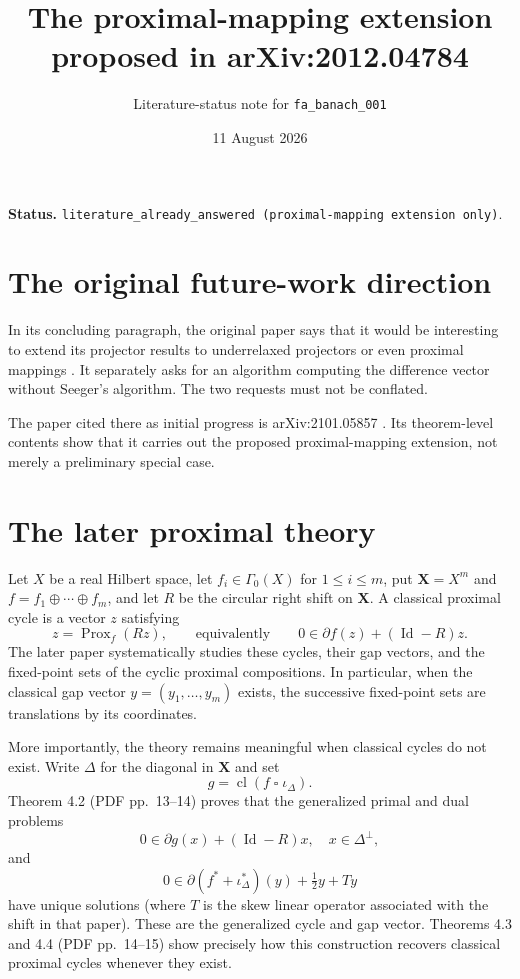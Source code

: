 \documentclass[11pt]{article}
\title{The proximal-mapping extension proposed in arXiv:2012.04784}
\author{Literature-status note for \texttt{fa\_banach\_001}}
\date{11 August 2026}
\newcommand{\Prox}{\operatorname{Prox}}
\newcommand{\cl}{\operatorname{cl}}
\newcommand{\Id}{\operatorname{Id}}
\newcommand{\ii}{\iota}
\begin{document}
\maketitle

\noindent\textbf{Status.}
\texttt{literature\_already\_answered (proximal-mapping extension only)}.

\section*{The original future-work direction}

In its concluding paragraph, the original paper says that it would be
interesting to extend its projector results to underrelaxed projectors or
even proximal mappings \cite[p.~25]{ABRW2021}.  It separately asks for an
algorithm computing the difference vector without Seeger's algorithm.  The
two requests must not be conflated.

The paper cited there as initial progress is arXiv:2101.05857
\cite{ABW2021}.  Its theorem-level contents show that it carries out the
proposed proximal-mapping extension, not merely a preliminary special case.

\section*{The later proximal theory}

Let $X$ be a real Hilbert space, let $f_i\in\Gamma_0(X)$ for
$1\leq i\leq m$, put $\mathbf X=X^m$ and
$f=f_1\oplus\cdots\oplus f_m$, and let $R$ be the circular right shift on
$\mathbf X$.  A classical proximal cycle is a vector $z$ satisfying
\[
 z=\Prox_f(Rz),\qquad\text{equivalently}\qquad
 0\in\partial f(z)+(\Id-R)z.
\]
The later paper systematically studies these cycles, their gap vectors, and
the fixed-point sets of the cyclic proximal compositions.  In particular,
when the classical gap vector $y=(y_1,\ldots,y_m)$ exists, the successive
fixed-point sets are translations by its coordinates.

More importantly, the theory remains meaningful when classical cycles do
not exist.  Write $\Delta$ for the diagonal in $\mathbf X$ and set
\[
 g=\cl(f\mathbin{\square}\ii_\Delta).
\]
Theorem 4.2 (PDF pp.~13--14) proves that the generalized primal and dual
problems
\[
 0\in\partial g(x)+(\Id-R)x,\quad x\in\Delta^\perp,
\]
and
\[
 0\in\partial(f^*+\ii_\Delta^*)(y)+\tfrac12y+Ty
\]
have unique solutions (where $T$ is the skew linear operator associated
with the shift in that paper).  These are the generalized cycle and gap
vector.  Theorems 4.3 and 4.4 (PDF pp.~14--15) show precisely how this
construction recovers classical proximal cycles whenever they exist.
\end{document}
